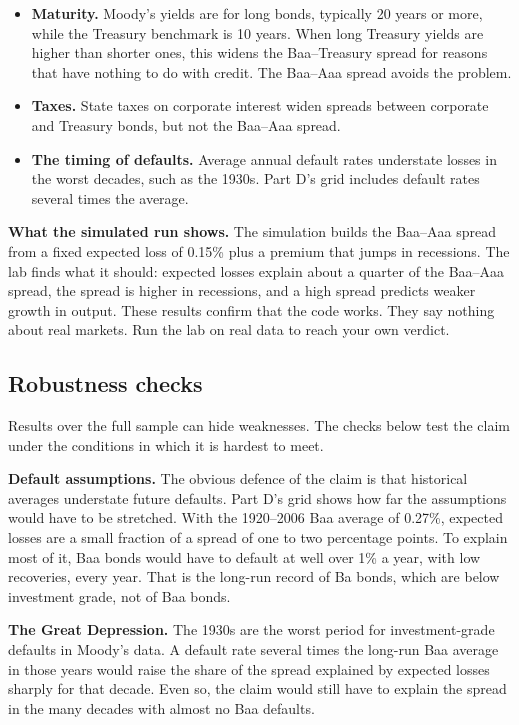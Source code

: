 \begin{itemize}
  \item \textbf{Maturity.} Moody's yields are for long bonds, typically 20 years or more, while the Treasury benchmark is 10 years. When long Treasury yields are higher than shorter ones, this widens the Baa--Treasury spread for reasons that have nothing to do with credit. The Baa--Aaa spread avoids the problem.
  \item \textbf{Taxes.} State taxes on corporate interest widen spreads between corporate and Treasury bonds, but not the Baa--Aaa spread.
  \item \textbf{The timing of defaults.} Average annual default rates understate losses in the worst decades, such as the 1930s. Part D's grid includes default rates several times the average.
\end{itemize}

\textbf{What the simulated run shows.} The simulation builds the Baa--Aaa spread from a fixed expected loss of 0.15\% plus a premium that jumps in recessions. The lab finds what it should: expected losses explain about a quarter of the Baa--Aaa spread, the spread is higher in recessions, and a high spread predicts weaker growth in output. These results confirm that the code works. They say nothing about real markets. Run the lab on real data to reach your own verdict.

\subsection{Robustness checks}
\label{sec:15-stress}

Results over the full sample can hide weaknesses. The checks below test the claim under the conditions in which it is hardest to meet.

\textbf{Default assumptions.} The obvious defence of the claim is that historical averages understate future defaults. Part D's grid shows how far the assumptions would have to be stretched. With the 1920--2006 Baa average of 0.27\%, expected losses are a small fraction of a spread of one to two percentage points. To explain most of it, Baa bonds would have to default at well over 1\% a year, with low recoveries, every year. That is the long-run record of Ba bonds, which are below investment grade, not of Baa bonds.

\textbf{The Great Depression.} The 1930s are the worst period for investment-grade defaults in Moody's data. A default rate several times the long-run Baa average in those years would raise the share of the spread explained by expected losses sharply for that decade. Even so, the claim would still have to explain the spread in the many decades with almost no Baa defaults.

